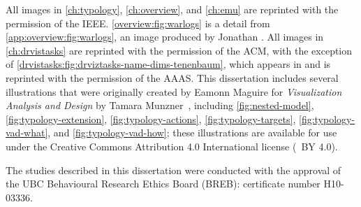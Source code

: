 All images in \autoref{ch:typology}, \autoref{ch:overview}, and \autoref{ch:emu} are reprinted with the permission of the IEEE.
\autoref{overview:fig:warlogs} is a detail from \autoref{app:overview:fig:warlogs}, an image produced by Jonathan \citet{Stray2010}.
All images in \autoref{ch:drvistasks} are reprinted with the permission of the ACM, with the exception of \autoref{drvistasks:fig:drviztasks-name-dims-tenenbaum}, which appears in \citet{Tenenbaum2000} and is reprinted with the permission of the AAAS.
This dissertation includes several illustrations that were originally created by Eamonn Maguire for {\it Visualization Analysis and Design} by Tamara Munzner~\cite{Munzner2014}, including \autoref{fig:nested-model}, \autoref{fig:typology-extension}, \autoref{fig:typology-actions}, \autoref{fig:typology-targets}, \autoref{fig:typology-vad-what}, and \autoref{fig:typology-vad-how}; these illustrations are available for use under the Creative Commons Attribution 4.0 International license (\ccLogo~BY 4.0).

The studies described in this dissertation were conducted with the approval of the UBC Behavioural Research Ethics Board (BREB): certificate number H10-03336.
